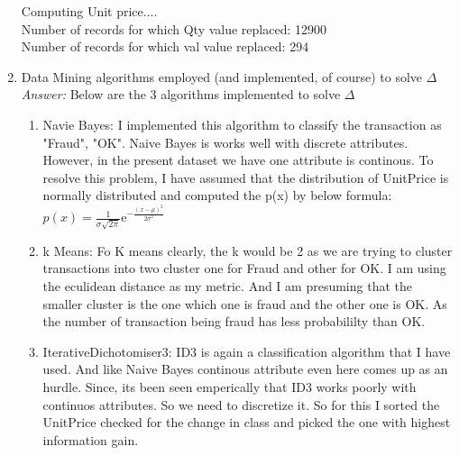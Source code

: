 \documentclass{article}
\begin{document}
\begin{enumerate}
Computing Unit price....\\
Number of records for which Qty value replaced: 12900\\
Number of records for which val value replaced: 294\\
		\item Data Mining algorithms employed (and implemented, of course) to solve $\Delta$\\
		\emph{Answer:} Below are the 3 algorithms implemented to solve $\Delta$
		\begin{enumerate}
			\item Navie Bayes: I implemented this algorithm to classify the transaction as "Fraud", "OK". Naive Bayes is works well with discrete attributes. However, in the present dataset we have one attribute is continous. To resolve this problem, I have assumed that the distribution of UnitPrice is normally distributed and computed the p(x) by below formula: \\
$p(x) = \frac{1}{\sigma \sqrt{2 \pi }}  \mathrm{e}^{-\frac{(x- \mu)^2}{2\sigma^2}}$

			\item k Means: Fo K means clearly, the k would be 2 as we are trying to cluster transactions into two cluster one for Fraud and other for OK.  I am using the eculidean distance as my metric. And I am presuming that the smaller cluster is the one which one is fraud and the other one is OK. As the number of transaction being fraud has less probabililty than OK.

			\item IterativeDichotomiser3: ID3 is again a classification algorithm that I have used. And like Naive Bayes  continous attribute even here comes up as an hurdle. Since, its been seen emperically that ID3 works poorly with continuos attributes. So we need to discretize it. So for this I sorted the UnitPrice checked for the change in class and picked the one with highest information gain.
		\end{enumerate}
		

\end{enumerate}
\end{document}
